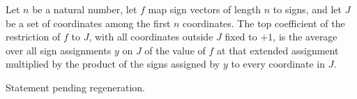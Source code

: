 \begin{definition}
\label{FABL.granularityRestrictionTopCoeff}
\leanok
{}
Let $n$ be a natural number, let $f$ map sign vectors of length $n$ to signs, and let
$J$ be a set of coordinates among the first $n$ coordinates. The top coefficient of the
restriction of $f$ to $J$, with all coordinates outside $J$ fixed to $+1$, is the
average over all sign assignments $y$ on $J$ of the value of $f$ at that extended
assignment multiplied by the product of the signs assigned by $y$ to every coordinate in
$J$.
\end{definition}

\begin{theorem}
\label{FABL.indicatorPolynomial_fourier_sum}
\leanok
{}
Statement pending regeneration.
\end{theorem}

